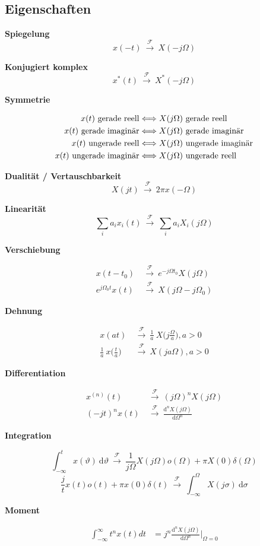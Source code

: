 \documentclass[10pt,a4paper]{article}
\newcommand{\fancyformula}[2]{
	\small
	\raggedright\sffamily\textbf{#1}
	#2
}
\newcommand{\ftransform}{
	~\xrightarrow{~\mathcal{F}~}~
}
\begin{document}
\subsection*{Eigenschaften}
\begin{multicols}{2}
	
\fancyformula{Spiegelung}{\[ x(-t)\ftransform X(-j\Omega) \]}
\fancyformula{Konjugiert komplex}{\[ x^*(t) \ftransform X^*(-j\Omega)\]}
\fancyformula{Symmetrie}{
\begin{align*}
	x(t) \textnormal{ gerade reell} &\Longleftrightarrow X(j\Omega) \textnormal{ gerade reell} \\
	x(t) \textnormal{ gerade imaginär} &\Longleftrightarrow X(j\Omega) \textnormal{ gerade imaginär} \\
	x(t) \textnormal{ ungerade reell} &\Longleftrightarrow X(j\Omega) \textnormal{ ungerade imaginär} \\
	x(t) \textnormal{ ungerade imaginär} &\Longleftrightarrow X(j\Omega) \textnormal{ ungerade reell} \\
\end{align*}
}
\fancyformula{Dualität / Vertauschbarkeit}{\[ X(jt)\ftransform 2\pi x(-\Omega) \]}
\fancyformula{Linearität}{\[ \sum_{i} a_i x_i(t) \ftransform \sum_{i} a_i X_i(j\Omega)\]}
\fancyformula{Verschiebung}{
\begin{align*}
	x(t-t_0) &\ftransform e^{-j\Omega t_0}X(j\Omega) \\
	e^{j\Omega_0t}x(t) &\ftransform X(j\Omega-j\Omega_0)
\end{align*}
}
\fancyformula{Dehnung}{
\begin{align*}
	x(at) &\ftransform \frac{1}{a}~X\bigg(j\frac{\Omega}{a}\bigg), a>0 \\
	\frac{1}{a}~x\bigg(\frac{t}{a}\bigg) &\ftransform X(ja\Omega), a>0
\end{align*}
}
\fancyformula{Differentiation}{
\begin{align*}
	x^{(n)}(t) &\ftransform (j\Omega)^nX(j\Omega) \\
	(-jt)^nx(t) &\ftransform \frac{\mathrm d^n X(j\Omega)}{\mathrm d\Omega^n}
\end{align*}	
}
\fancyformula{Integration}{
	\[\int_{-\infty}^{t}x(\vartheta) ~ \mathrm d\vartheta \ftransform \frac{1}{j\Omega} X(j\Omega) o(\Omega)+\pi X(0)\delta(\Omega)\]
	\[\frac{j}{t}x(t)o(t)+\pi x(0) \delta(t)  \ftransform \int_{-\infty}^{\Omega}X(j\sigma) ~ \mathrm d\sigma \]
}
\fancyformula{Moment}{
\begin{align*}
	\int_{-\infty}^{\infty}t^n x(t)dt &= j^n \frac{\mathrm d^nX(j\Omega)}{\mathrm d\Omega^n} \bigg|_{\Omega=0} \\

\end{align*}}
\end{multicols}
\end{document}
